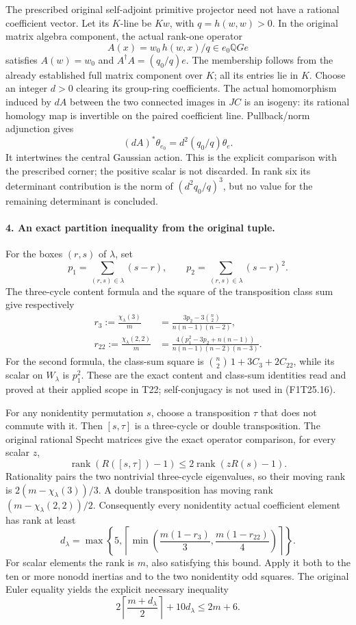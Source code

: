 The prescribed original self-adjoint primitive projector
need not have a rational coefficient vector. Let its
$K$-line be $Kw$, with $q=h(w,w)>0$. In the original
matrix algebra component, the actual rank-one operator
\[
             A(x)=w_0\,h(w,x)/q
                   \in e_0\mathbb QG e
 \tag{F1T25.14}
\]
satisfies $A(w)=w_0$ and $A^\dagger A=(q_0/q)e$.
The membership follows from the already established
full matrix component over $K$; all its entries lie
in $K$. Choose an integer $d>0$ clearing its group-ring
coefficients. The actual homomorphism induced by $dA$
between the two connected images in $JC$ is an isogeny:
its rational homology map is invertible on the paired
coefficient line. Pullback/norm adjunction gives
\[
              (dA)^*\theta_{e_0}=d^2(q_0/q)\theta_e.
 \tag{F1T25.15}
\]
It intertwines the central Gaussian action. This is the
explicit comparison with the prescribed corner; the
positive scalar is not discarded. In rank six its
determinant contribution is the norm of
$(d^2q_0/q)^3$, but no value for the remaining determinant
is concluded.

\paragraph{4. An exact partition inequality from the original tuple.}
For the boxes $(r,s)$ of $\lambda$, set
\[
 p_1=\sum_{(r,s)\in\lambda}(s-r),\qquad
 p_2=\sum_{(r,s)\in\lambda}(s-r)^2.
\]
The three-cycle content formula and the square of the
transposition class sum give respectively
\[
 \begin{split}
 r_3:=\frac{\chi_\lambda(3)}m
   &=\frac{3p_2-3\binom n2}{n(n-1)(n-2)},\\
 r_{22}:=\frac{\chi_\lambda(2,2)}m
   &=\frac{4(p_1^2-3p_2+n(n-1))}
                 {n(n-1)(n-2)(n-3)}.
 \end{split}
 \tag{F1T25.16}
\]
For the second formula, the class-sum square is
$\binom n2\,1+3C_3+2C_{22}$, while its scalar on
$W_\lambda$ is $p_1^2$. These are the exact content
and class-sum identities read and proved at their
applied scope in T22; self-conjugacy is not used in
(F1T25.16).

For any nonidentity permutation $s$, choose a
transposition $\tau$ that does not commute with it.
Then $[s,\tau]$ is a three-cycle or double transposition.
The original rational Specht matrices give the exact
operator comparison, for every scalar $z$,
\[
 \operatorname{rank}(R([s,\tau])-1)
            \le2\operatorname{rank}(zR(s)-1).
\]
Rationality pairs the two nontrivial three-cycle
eigenvalues, so their moving rank is
$2(m-\chi_\lambda(3))/3$. A double transposition has
moving rank $(m-\chi_\lambda(2,2))/2$. Consequently
every nonidentity actual coefficient element has rank
at least
\[
 d_\lambda=
 \max\left\{5,
  \left\lceil\min\left(
       \frac{m(1-r_3)}3,\frac{m(1-r_{22})}4
                         \right)\right\rceil\right\}.
 \tag{F1T25.17}
\]
For scalar elements the rank is $m$, also satisfying
this bound. Apply it both to the ten or more nonodd
inertias and to the two nonidentity odd squares.
The original Euler equality yields the explicit
necessary inequality
\[
 2\left\lceil\frac{m+d_\lambda}{2}\right\rceil
                  +10d_\lambda\le2m+6.
 \tag{F1T25.18}
\]

